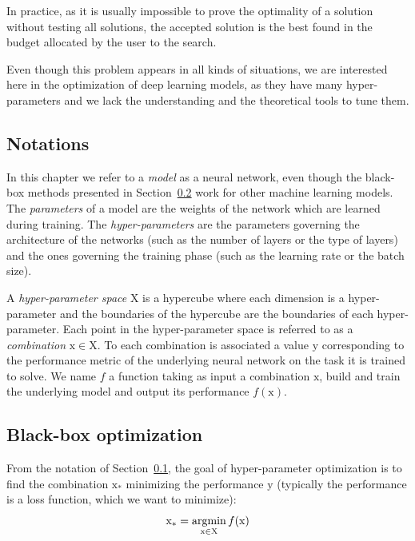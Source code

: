 In practice, as it is usually impossible to prove the optimality of a solution without testing all solutions, the accepted solution is the best found in the budget allocated by the user to the search.

Even though this problem appears in all kinds of situations, we are interested here in the optimization of deep learning models, as they have many hyper-parameters and we lack the understanding and the theoretical tools to tune them.

\subsection{Notations}
\label{ssec:notation}

In this chapter we refer to a \textit{model} as a neural network, even though the black-box methods presented in Section~\ref{ssec:black_box} work for other machine learning models. The \textit{parameters} of a model are the weights of the network which are learned during training. The \textit{hyper-parameters} are the parameters governing the architecture of the networks (such as the number of layers or the type of layers) and the ones governing the training phase (such as the learning rate or the batch size). 

A \textit{hyper-parameter space} $\mathrm{X}$ is a hypercube where each dimension is a hyper-parameter and the boundaries of the hypercube are the boundaries of each hyper-parameter. Each point in the hyper-parameter space is referred to as a \textit{combination} $\mathrm{x} \in \mathrm{X}$. To each combination is associated a value $\mathrm{y}$ corresponding to the performance metric of the underlying neural network on the task it is trained to solve. We name $f$ a function taking as input a combination $\mathrm{x}$, build and train the underlying model and output its performance $f\left( \mathrm{x} \right)$.

\subsection{Black-box optimization}
\label{ssec:black_box}

From the notation of Section~\ref{ssec:notation}, the goal of hyper-parameter optimization is to find the combination $\mathrm{x_*}$ minimizing the performance $\mathrm{y}$ (typically the performance is a loss function, which we want to minimize):
\begin{equation}
	\mathrm{x_*} = \operatorname*{argmin}_{\mathrm{x} \in \mathrm{X}} f(\mathrm{x})
\end{equation}

